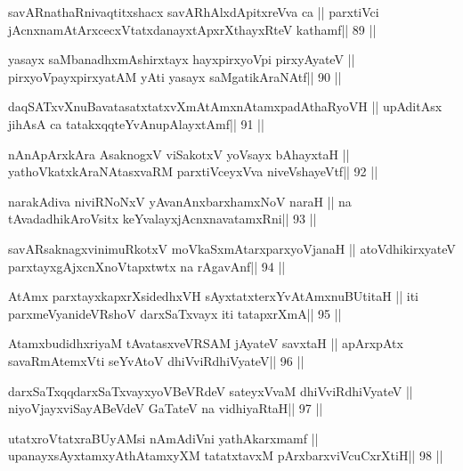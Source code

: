 \begin{shl}
savARnathaRnivaqtitxshacx savARhAlxdApitxreVva ca ||
parxtiVci jAcnxnamAtArxcecxVtatxdanayxtApxrXthayxRteV kathamf\hfill || 89 ||
\end{shl}

\begin{shl}
yasayx saMbanadhxmAshirxtayx hayxpirxyoV\s pi pirxyAyateV ||
pirxyoV\s payxpirxyatAM yAti yasayx saMgatikAraNAtf\hfill || 90 ||
\end{shl}

\begin{shl}
daqSATxvX\s nuBavatasatxtatxvXmAtAmxnAtamxpadAthaRyoVH ||
upAditAsx jihAsA ca tatakxqqteYvAnupAlayxtAmf\hfill || 91 ||
\end{shl}

\begin{shl}
nAnApArxkAra AsaknogxV viSakotxV yoV\s sayx bAhayxtaH ||
yathoVkatxkAraNAtasxvaRM parxtiVceyxVva niveVshayeVtf\hfill || 92 ||
\end{shl}

\begin{shl}
narakAdiva niviRNoNxV yAvanAnx\s\s  barxhamxNoV naraH ||
na tAvadadhikAroV\s sitx keYvalayxjAcnxnavatamxRni\hfill || 93 ||
\end{shl}

\begin{shl}
savARsaknagxvinimuRkotxV moVkaSxmAtarxparxyoVjanaH ||
atoV\s dhikirxyateV parxtayxgAjxcnXnoVtapxtwtx na rAgavAnf\hfill || 94 ||
\end{shl}

\begin{shl}
AtAmx parxtayxkapxrXsidedhxVH sAyxtatxterxYvA\s\s tAmxnuBUtitaH ||
iti parxmeVyanideVRshoV darxSaTxvayx iti tatapxrXmA\hfill || 95 ||
\end{shl}

\begin{shl}
AtamxbudidhxriyaM tAvatasxveVRSAM jAyateV savxtaH ||
apArxpAtx savaRmAtemxVti seYvAtoV dhiVviRdhiVyateV\hfill || 96 ||
\end{shl}

\begin{shl}
darxSaTxqqdarxSaTxvayxyoVBeVRdeV sateyxVvaM dhiVviRdhiVyateV ||
niyoVjayxviSayABeVdeV GaTateV na vidhiyaRtaH\hfill || 97 ||
\end{shl}

\begin{shl}
utatxroVtatxraBUyAMsi nAmAdiVni yathAkarxmamf ||
upanayxsAyx\s\s tamxyAthAtamxyXM tatatxtavxM pArxbarxviVcuCxrXtiH\hfill || 98 ||
\end{shl}

